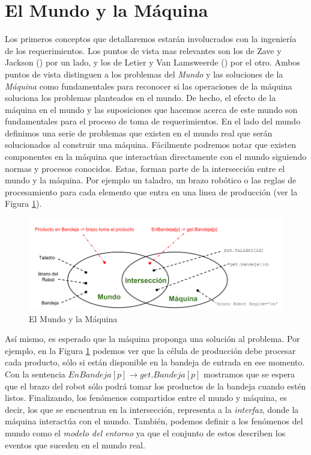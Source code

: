 \section{El Mundo y la Máquina}

Los primeros conceptos que detallaremos estarán involucrados con la ingeniería de los requerimientos. Los puntos de vista
mas relevantes son los de Zave y Jackson (\cite{Zave97fourdark, Jackson:1995:SRA:210207, 5071113}) por un lado, y los de
Letier y Van Lamsweerde (\cite{879820, VanLamsweerde:2001:GRE:882477.883624}) por el otro. Ambos puntos de vista
distinguen a los problemas del \emph{Mundo} y las soluciones de la \emph{Máquina} como fundamentales para reconocer si 
las operaciones de la máquina soluciona los problemas planteados en el mundo. De hecho, el efecto de la máquina en el mundo y las
suposiciones que hacemos acerca de este mundo son fundamentales para el proceso de toma de requerimientos. En el lado
del mundo definimos una serie de problemas que existen en el mundo real que serán solucionados al construir una máquina.
Fácilmente podremos notar que existen componentes en la máquina que interactúan directamente con el mundo siguiendo
normas y procesos conocidos. Estas, forman parte de la intersección entre el mundo y la máquina. Por ejemplo un taladro,
un brazo robótico o las reglas de procesamiento para cada elemento que entra en una linea de producción (ver la Figura
\ref{world_and_machine}).

\begin{figure}
    \centering
    \includegraphics[scale=0.45]{img/world_and_machine.png}
    \caption{El Mundo y la Máquina}
    \label{world_and_machine}
\end{figure}

Así mismo, es esperado que la máquina proponga una solución al problema. Por ejemplo, en la Figura \ref{world_and_machine}
podemos ver que la célula de producción debe procesar cada producto, sólo si están disponible en la bandeja de entrada en ese
momento. Con la sentencia $EnBandeja[p] \rightarrow get.Bandeja[p]$ mostramos que se espera que el brazo del robot sólo
podrá tomar los productos de la bandeja cuando estén listos. Finalizando, los fenómenos compartidos entre el mundo y
máquina, es decir, los que se encuentran en la intersección, representa a la \emph{interfaz}, donde la máquina
interactúa con el mundo. También, podemos definir a los fenómenos del mundo como el \emph{modelo del entorno} ya que el
conjunto de estos describen los eventos que suceden en el mundo real.

